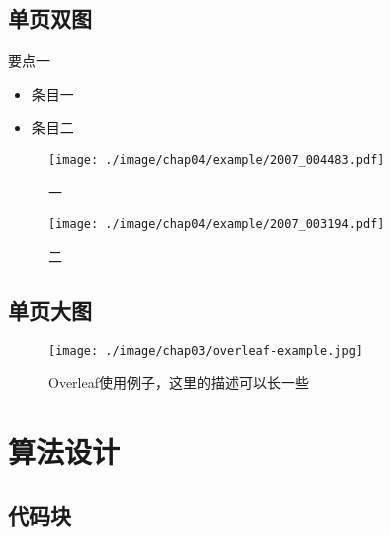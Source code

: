 \documentclass[
    fontset=fandol,
    xcolor=x11names %
]{ctexbeamer}
\begin{document}
\subsection{单页双图}

\begin{frame}

    \begin{block}{要点一}
        \begin{itemize}
            \item 条目一
            \item 条目二
        \end{itemize}
    \end{block}

    \begin{figure}
        \begin{minipage}{0.49\linewidth}
            \texttt{[image: ./image/chap04/example/2007\_004483.pdf]}
            \caption{一}
        \end{minipage}
        \begin{minipage}{0.49\linewidth}
            \texttt{[image: ./image/chap04/example/2007\_003194.pdf]}
            \caption{二}
        \end{minipage}
    \end{figure}

\end{frame}

\subsection{单页大图}

\begin{frame}

    \begin{figure}
        \texttt{[image: ./image/chap03/overleaf-example.jpg]}
        \caption{Overleaf使用例子，这里的描述可以长一些}
        \label{fig:overleaf-example}
    \end{figure}

\end{frame}

\section{算法设计}

\subsection{代码块}
\end{document}
